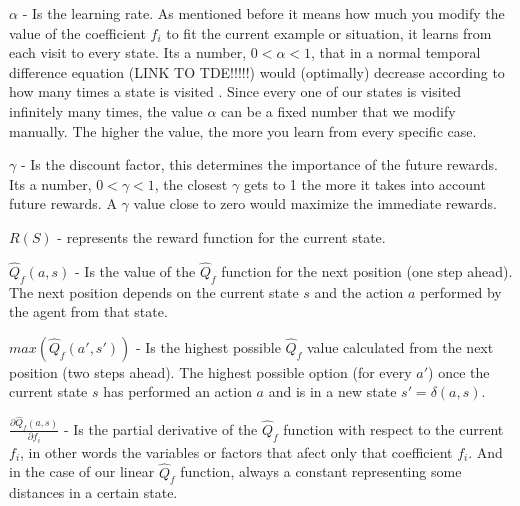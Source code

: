 \begin{flushleft}
$\alpha$  - Is the learning rate. As mentioned before it means how much you modify the value of the coefficient $f_i$ to fit the current example or situation, it learns from each visit to every state. Its a number, $0 < \alpha < 1$, that in a normal temporal difference equation (LINK TO TDE!!!!!) would (optimally) decrease according to how many times a state is visited \cite{rl}. Since every one of our states is visited infinitely many times, the value $\alpha$ can be a fixed number that we modify manually. The higher the value, the more you learn from every specific case.
\end{flushleft} 

\begin{flushleft}
$\gamma$  - Is the discount factor, this determines the importance of the future rewards. Its a number, $0 < \gamma < 1$, the closest $\gamma$ gets to 1 the more it takes into account future rewards. A $\gamma$ value close to zero would maximize the immediate rewards. 
\end{flushleft} 

\begin{flushleft}
$R(S)$ -  represents the reward function for the current state.
\end{flushleft} 

\begin{flushleft}
$\hat{Q}_f(a,s)$ - Is the value of the $\hat{Q}_f$ function for the next position (one step ahead). The next position depends on the current state $s$ and the action $a$ performed by the agent from that state.
\end{flushleft} 

\begin{flushleft}
$max(\hat{Q}_f(a',s'))$ - Is the highest possible $\hat{Q}_f$ value calculated from the next position (two steps ahead). The highest possible option (for every $a'$) once the current state $s$ has performed an action $a$ and is in a new state $s' = \delta(a,s)$. 
\end{flushleft} 

\begin{flushleft}
$\frac{\partial \hat{Q}_f(a,s)}{\partial f_i}$  - Is the partial derivative of the $\hat{Q}_f$ function with respect to the current $f_i$, in other words the variables or factors that afect only that coefficient $f_i$. And in the case of our  linear $\hat{Q}_f$ function, always a constant representing some distances in a certain state. 
\end{flushleft} 


